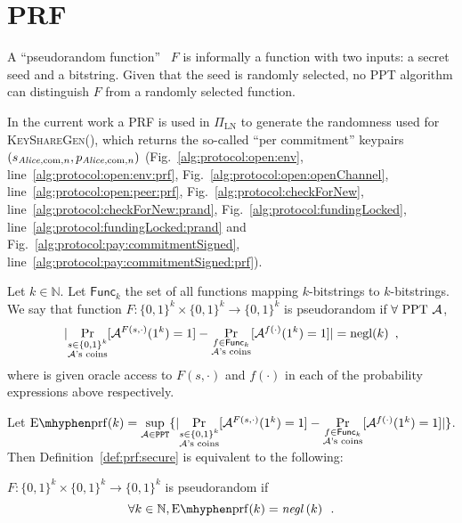 \section{PRF}
  A ``pseudorandom function''~\cite{katzlindell} $F$ is informally a function
  with two inputs: a secret seed and a bitstring. Given that the seed is
  randomly selected, no PPT algorithm can distinguish $F$ from a randomly
  selected function.

  In the current work a PRF is used in $\Pi_{\mathrm{LN}}$ to generate the
  randomness used for \textsc{KeyShareGen}(), which returns the so-called ``per
  commitment'' keypairs $(s_{\mathit{Alice}, \mathrm{com}, n}, p_{\mathit{Alice}, \mathrm{com},
  n})$ (Fig.~\ref{alg:protocol:open:env}, line~\ref{alg:protocol:open:env:prf},
  Fig.~\ref{alg:protocol:open:openChannel},
  line~\ref{alg:protocol:open:peer:prf}, Fig.~\ref{alg:protocol:checkForNew},
  line~\ref{alg:protocol:checkForNew:prand},
  Fig.~\ref{alg:protocol:fundingLocked},
  line~\ref{alg:protocol:fundingLocked:prand} and
  Fig.~\ref{alg:protocol:pay:commitmentSigned},
  line~\ref{alg:protocol:pay:commitmentSigned:prf}).

  \begin{definition}
    \label{def:prf:secure}
    Let $k \in \mathbb{N}$. Let $\mathsf{Func}_k$ the set of all functions
    mapping $k$-bitstrings to $k$-bitstrings. We say that function $F: \{0,
    1\}^k \times \{0, 1\}^k \rightarrow \{0, 1\}^k$ is pseudorandom if $\forall
    \text{ PPT } \mathcal{A}$,
    \begin{equation*}
      |\underset{\substack{s \in \{0, 1\}^k \\ \mathcal{A}\text{'s
      coins}}}{\Pr}[\mathcal{A}^{F(s, \cdot)}(1^k) = 1] - \underset{\substack{f
      \in \mathsf{Func}_k \\ \mathcal{A}\text{'s
      coins}}}{\Pr}[\mathcal{A}^{f(\cdot)}(1^k) = 1]| = \text{negl}(k) \enspace,
    \end{equation*}
    where \adversary{} is given oracle access to $F(s, \cdot)$ and $f(\cdot)$ in
    each of the probability expressions above respectively.
  \end{definition}

    Let $\mathrm{E \mhyphen prf}(k) = \underset{\adversary \in
    \mathtt{PPT}}{\sup}\{|\underset{\substack{s \in \{0, 1\}^k \\
    \adversary\text{'s coins}}}{\Pr}[\adversary^{F(s, \cdot)}(1^k) = 1] -
    \underset{\substack{f \in \mathsf{Func}_k \\ \adversary\text{'s
    coins}}}{\Pr}[\adversary^{f(\cdot)}(1^k) = 1]|\}$. Then
    Definition~\ref{def:prf:secure} is equivalent to the following:

    \begin{definition}
      \label{def:prf:secure:sup}
      $F: \{0, 1\}^k \times \{0, 1\}^k \rightarrow \{0, 1\}^k$ is pseudorandom
      if
      \begin{equation*}
        \forall k \in \mathbb{N}, \mathrm{E \mhyphen prf}(k) =
        \mathit{negl}\left(k\right) \enspace.
      \end{equation*}
    \end{definition}
